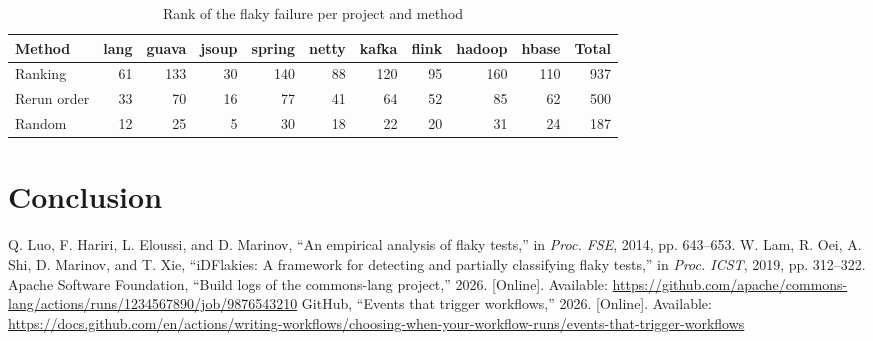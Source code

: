 \documentclass[10pt,conference,letterpaper]{IEEEtran}
\begin{document}
\begin{table}[t]
\caption{Projects and failures}
\label{tab:projects}
\centering
{}
\end{table}

\lipsum[9-10]

\begin{table}[t]
\caption{Rank of the flaky failure per project and method}
\label{tab:ranks}
\centering
\begin{tabular*}{\textwidth}{@{\extracolsep{\fill}}lrrrrrrrrrr@{}}
\toprule
Method & lang & guava & jsoup & spring & netty & kafka & flink & hadoop & hbase & Total \\
\midrule
Ranking & 61 & 133 & 30 & 140 & 88 & 120 & 95 & 160 & 110 & 937 \\
Rerun order & 33 & 70 & 16 & 77 & 41 & 64 & 52 & 85 & 62 & 500 \\
Random & 12 & 25 & 5 & 30 & 18 & 22 & 20 & 31 & 24 & 187 \\
\bottomrule
\end{tabular*}
\end{table}

\lipsum[11-13]

\section{Conclusion}
\lipsum[15]

\begin{thebibliography}{9}
 Q. Luo, F. Hariri, L. Eloussi, and D. Marinov, ``An empirical analysis of flaky
tests,'' in \emph{Proc. FSE}, 2014, pp. 643--653.
 W. Lam, R. Oei, A. Shi, D. Marinov, and T. Xie, ``iDFlakies: A framework for
detecting and partially classifying flaky tests,'' in \emph{Proc. ICST}, 2019, pp. 312--322.
 Apache Software Foundation, ``Build logs of the commons-lang project,'' 2026.
[Online]. Available: \url{https://github.com/apache/commons-lang/actions/runs/1234567890/job/9876543210}
 GitHub, ``Events that trigger workflows,'' 2026. [Online]. Available:
\url{https://docs.github.com/en/actions/writing-workflows/choosing-when-your-workflow-runs/events-that-trigger-workflows}
\end{thebibliography}
\end{document}
